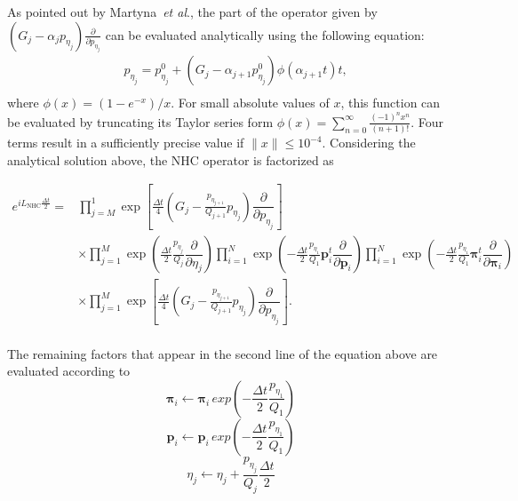 \documentclass[aip,jcp,reprint,amsmath,amssymb,amsfont]{revtex4-1}
\newcommand{\vt}[1]{\boldsymbol{\mathbf{#1}}}           %
\newcommand{\tr}[1]{#1^t}                               %
\newcommand{\diff}[2]{\dfrac{\partial #1}{\partial #2}} %
\begin{document}
As pointed out by Martyna~\textit{et al}.,\cite{Martyna1996} the part of the operator given by $(G_j - \alpha_j p_{\eta_j}) \frac{\partial}{\partial p_{\eta_j}}$ can be evaluated analytically using the following equation:
\begin{equation}
\label{eq:p_eta}
\begin{split}
&p_{\eta_j} = p_{\eta_j}^0 + \left( G_j - \alpha_{j+1} p_{\eta_j}^0 \right) \phi(\alpha_{j+1} t) t, \\
\end{split}
\end{equation}
where $\phi(x) = (1-e^{-x})/x$. For small absolute values of $x$, this function can be evaluated by truncating its Taylor series form $\phi(x) = \sum_{n=0}^\infty \frac{(-1)^n x^n}{(n+1)!}$. Four terms result in a sufficiently precise value if $\|x\| \leq 10^{-4}$. Considering the analytical solution above, the NHC operator is factorized as
\begin{widetext}
\begin{equation}
\begin{split}
e^{i\!L_\text{NHC} \frac{\Delta t}{2}} =  &\prod_{j=M}^{1} \exp\left[\frac{\Delta t}{4} \left( G_j - \frac{p_{\eta_{j+1}}}{Q_{j+1}} p_{\eta_j} \right) \diff{}{p_{\eta_j}}\right] \\
&  \times \prod_{j=1}^{M} \exp\left(\frac{\Delta t}{2} \frac{p_{\eta_j}}{Q_j}\diff{}{\eta_j}\right)  \prod_{i=1}^{N} \exp\left(-\frac{\Delta t}{2} \frac{p_{\eta_1}}{Q_1}\tr{\vt p}_i \diff{}{\vt p_i}\right) \prod_{i=1}^{N} \exp\left(-\frac{\Delta t}{2} \frac{p_{\eta_1}}{Q_1}\tr{\vt \pi}_i \diff{}{\vt \pi_i}\right)  \\
& \times \prod_{j=1}^{M} \exp\left[\frac{\Delta t}{4} \left( G_j - \frac{p_{\eta_{j+1}}}{Q_{j+1}} p_{\eta_j} \right) \diff{}{p_{\eta_j}}\right].\\
\end{split}
\end{equation}
\end{widetext}
The remaining factors that appear in the second line of the equation above are evaluated according to\cite{Martyna1996}
\begin{equation}
\vt \pi_i \leftarrow \vt \pi_i \, exp\left(-\frac{\Delta t}{2}\frac{p_{\eta_1}}{Q_1}\right)
\end{equation}
\begin{equation}
\vt p_i \leftarrow \vt p_i \, exp\left(-\frac{\Delta t}{2}\frac{p_{\eta_1}}{Q_1}\right)
\end{equation}
\begin{equation}
\eta_j  \leftarrow \eta_j + \frac{p_{\eta_j}}{ Q_j} \frac{\Delta t}{2} 
\end{equation}
\end{document}
